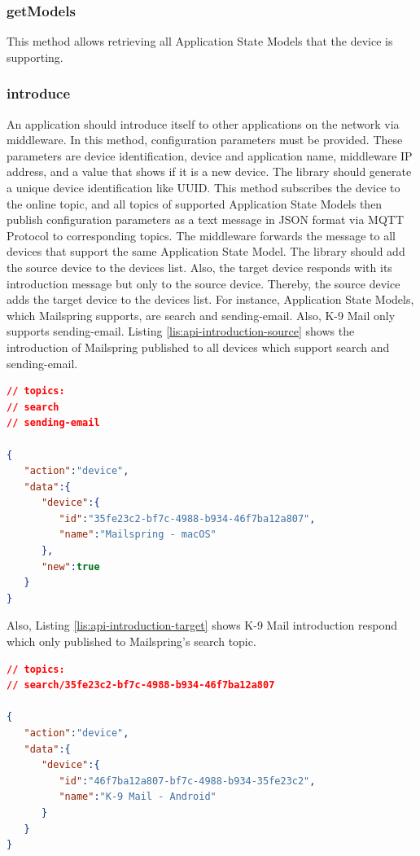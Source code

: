 \subsubsection{getModels}
This method allows retrieving all Application State Models that the device is supporting. 

\subsubsection{introduce}
An application should introduce itself to other applications on the network via middleware. In this method, configuration parameters must be provided. These parameters are device identification, device and application name, middleware IP address, and a value that shows if it is a new device. The library should generate a unique device identification like UUID. This method subscribes the device to the online topic, and all topics of supported Application State Models then publish configuration parameters as a text message in JSON format via MQTT Protocol to corresponding topics. The middleware forwards the message to all devices that support the same Application State Model. The library should add the source device to the devices list. Also, the target device responds with its introduction message but only to the source device. Thereby, the source device adds the target device to the devices list. For instance, Application State Models, which Mailspring supports, are search and sending-email. Also, K-9 Mail only supports sending-email. Listing \ref{lis:api-introduction-source} shows the introduction of Mailspring published to all devices which support search and sending-email. 

\lstset{
  label=lis:api-introduction-source,caption=The source device introduction message.
}
\begin{lstlisting}[language=json]
// topics:
// search
// sending-email

{
   "action":"device",
   "data":{
      "device":{
         "id":"35fe23c2-bf7c-4988-b934-46f7ba12a807",
         "name":"Mailspring - macOS"
      },
      "new":true
   }
}
\end{lstlisting}

Also, Listing \ref{lis:api-introduction-target} shows K-9 Mail introduction respond which only published to Mailspring's search topic.
\lstset{
  label=lis:api-introduction-target,caption=The target device introduction respond message.
}
\begin{lstlisting}[language=json]
// topics:
// search/35fe23c2-bf7c-4988-b934-46f7ba12a807

{
   "action":"device",
   "data":{
      "device":{
         "id":"46f7ba12a807-bf7c-4988-b934-35fe23c2",
         "name":"K-9 Mail - Android"
      }
   }
}
\end{lstlisting}
